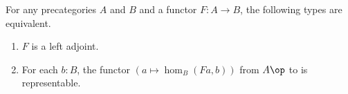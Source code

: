 %
\begin{lem}\label{ct:adj-repr}
  For any precategories $A$ and $B$ and a functor $F:A\to B$, the following types are equivalent.
  \begin{enumerate}
  \item $F$ is a left adjoint.\label{item:ct:ar1}
  \item For each $b:B$, the functor $(a \mapsto \hom_B(Fa,b))$ from $A\op$ to \uset is representable.\label{item:ct:ar2}
  \end{enumerate}
\end{lem}

